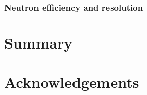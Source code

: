 \documentclass[review]{elsarticle}
\begin{document}
\subsubsection{Neutron efficiency and resolution}


	




\section{Summary}


\section{Acknowledgements}

\clearpage
\end{document}
